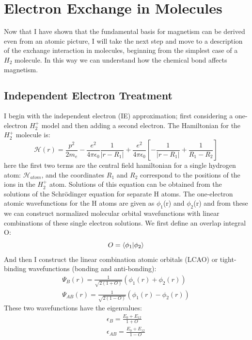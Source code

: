 \section{Electron Exchange in Molecules}

Now that I have shown that the fundamental basis for magnetism can be derived even from an atomic picture, I will take the next step and move to a description of the exchange interaction in molecules, beginning from the simplest case of a $H_2$ molecule. In this way we can understand how the chemical bond affects magnetism.

\subsection{Independent Electron Treatment}

I begin with the independent electron (IE) approximation; first considering a one-electron $H_2^+$ model and then adding a second electron. The Hamiltonian for the $H_2^+$ molecule is:
\begin{equation}
\mathscr{H}(r) = \frac{p^2}{2m_e}-\frac{e^2}{4\pi\epsilon_0}\frac{1}{|r-R_1|}+\frac{e^2}{4\pi\epsilon_0}\left[-\frac{1}{|r-R_1|}+\frac{1}{R_1-R_2}\right]
\end{equation}
here the first two terms are the central field hamiltonian for a single hydrogen atom: $\mathscr{H}_{atom}$, and the coordinates $R_1$ and $R_2$ correspond to the positions of the ions in the $H_2^+$ atom. Solutions of this equation can be obtained from the solutions of the Schr\"odinger equation for separate H atoms. The one-electron atomic wavefunctions for the H atoms are given as $\phi_1$(r) and $\phi_2$(r) and from these we can construct normalized molecular orbital wavefunctions with linear combinations of these single electron solutions. We first define an overlap integral O:
\begin{equation}
O=\braket{\phi_1|\phi_2}
\end{equation}
And then I construct the linear combination atomic orbitals (LCAO) or tight-binding wavefunctions (bonding and anti-bonding):
\begin{eqnarray}
\Psi_B(r) = \frac{1}{\sqrt{2(1+O)}}(\phi_1(r)+\phi_2(r))
\label{LCAO_B} \\
\Psi_{AB}(r) = \frac{1}{\sqrt{2(1-O)}}(\phi_1(r)-\phi_2(r))
\label{LCAO_AB}
\end{eqnarray}
These two wavefunctions have the eigenvalues:
\begin{eqnarray}
\epsilon_B=\frac{E_0+E_{12}}{1+O} \\
\epsilon_{AB}=\frac{E_0+E_{12}}{1-O}
\end{eqnarray}
